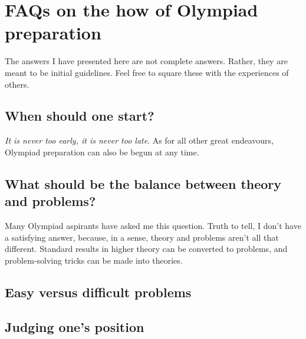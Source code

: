 \documentclass[a4paper]{amsart}
\begin{document}
\section{FAQs on the how of Olympiad preparation}

The answers I have presented here are not complete answers. Rather, they are meant to be initial guidelines.
Feel free to square these with the experiences of others.

\subsection{When should one start?}

{\em It is never too early, it is never too late}. As for all other great endeavours, Olympiad preparation can also
be begun at any time.

\subsection{What should be the balance between theory and problems?}

Many Olympiad aspirants have asked me this question. Truth to tell, I don't have a satisfying answer, because, in a sense,
theory and problems aren't all that different. Standard results in higher theory can be converted to problems, and problem-solving
tricks can be made into theories.


\subsection{Easy versus difficult problems}

\subsection{Judging one's position}
\end{document}
